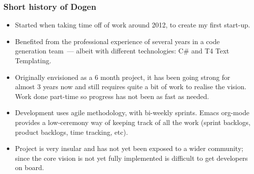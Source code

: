 \documentclass{beamer}
\begin{document}
\begin{frame}
\frametitle{Short history of Dogen}

\begin{itemize}

\item Started when taking time off of work around 2012, to create my
  first start-up.

\pause

\item Benefited from the professional experience of several years in a
  code generation team~--- albeit with different technologies: C\# and
  T4 Text Templating.

\pause

\item Originally envisioned as a 6 month project, it has been going
  strong for almost 3 years now and still requires quite a bit of work
  to realise the vision. Work done part-time so progress has not been
  as fast as needed.

\pause

\item Development uses agile methodology, with bi-weekly
  sprints. Emacs org-mode provides a low-ceremony way of keeping track
  of all the work (sprint backlogs, product backlogs, time tracking,
  etc).

\pause

\item Project is very insular and has not yet been exposed to a wider
  community; since the core vision is not yet fully implemented is
  difficult to get developers on board.

\end{itemize}

\end{frame}
\end{document}
